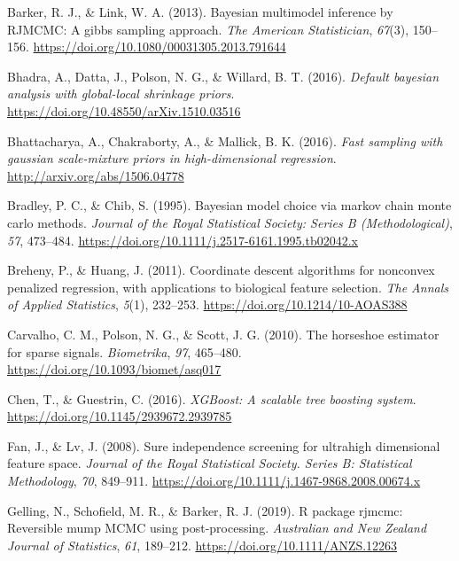 \documentclass[
  11pt,
]{article}
\newlength{\cslhangindent}
\newlength{\cslentryspacingunit} %
\newenvironment{CSLReferences}[2] %
 {%
  \setlength{\parindent}{0pt}
  \ifodd #1
  \let\oldpar\par
  \def\par{\hangindent=\cslhangindent\oldpar}
  \fi
  \setlength{\parskip}{#2\cslentryspacingunit}
 }%
 {}
\begin{document}
\hypertarget{refs}{}
\begin{CSLReferences}{1}{0}
\leavevmode{}%
Barker, R. J., \& Link, W. A. (2013). Bayesian multimodel inference by
RJMCMC: A gibbs sampling approach. \emph{The American Statistician},
\emph{67}(3), 150--156.
\url{https://doi.org/10.1080/00031305.2013.791644}

\leavevmode{}%
Bhadra, A., Datta, J., Polson, N. G., \& Willard, B. T. (2016).
\emph{Default bayesian analysis with global-local shrinkage priors}.
\url{https://doi.org/10.48550/arXiv.1510.03516}

\leavevmode{}%
Bhattacharya, A., Chakraborty, A., \& Mallick, B. K. (2016). \emph{Fast
sampling with gaussian scale-mixture priors in high-dimensional
regression}. \url{http://arxiv.org/abs/1506.04778}

\leavevmode{}%
Bradley, P. C., \& Chib, S. (1995). Bayesian model choice via markov
chain monte carlo methods. \emph{Journal of the Royal Statistical
Society: Series B (Methodological)}, \emph{57}, 473--484.
\url{https://doi.org/10.1111/j.2517-6161.1995.tb02042.x}

\leavevmode{}%
Breheny, P., \& Huang, J. (2011). {Coordinate descent algorithms for
nonconvex penalized regression, with applications to biological feature
selection}. \emph{The Annals of Applied Statistics}, \emph{5}(1),
232--253. \url{https://doi.org/10.1214/10-AOAS388}

\leavevmode{}%
Carvalho, C. M., Polson, N. G., \& Scott, J. G. (2010). The horseshoe
estimator for sparse signals. \emph{Biometrika}, \emph{97}, 465--480.
\url{https://doi.org/10.1093/biomet/asq017}

\leavevmode{}%
Chen, T., \& Guestrin, C. (2016). \emph{XGBoost: A scalable tree
boosting system}. \url{https://doi.org/10.1145/2939672.2939785}

\leavevmode{}%
Fan, J., \& Lv, J. (2008). Sure independence screening for ultrahigh
dimensional feature space. \emph{Journal of the Royal Statistical
Society. Series B: Statistical Methodology}, \emph{70}, 849--911.
\url{https://doi.org/10.1111/j.1467-9868.2008.00674.x}

\leavevmode{}%
Gelling, N., Schofield, M. R., \& Barker, R. J. (2019). R package
rjmcmc: Reversible mump MCMC using post-processing. \emph{Australian and
New Zealand Journal of Statistics}, \emph{61}, 189--212.
\url{https://doi.org/10.1111/ANZS.12263}


\end{CSLReferences}
\end{document}
